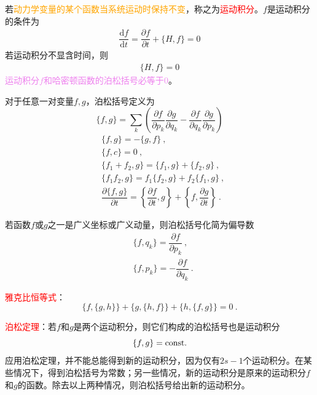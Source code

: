 \documentclass[11pt,a4paper]{article}
\newcommand{\dif}{\mathrm{d}}
\begin{document}
若\textcolor{orange}{动力学变量的某个函数当系统运动时保持不变}，称之为\textcolor{red}{运动积分}。$f$是运动积分的条件为
\begin{align*}
\dfrac{\dif f}{\dif t} = \dfrac{\partial f}{\partial t} + \{H, f \}  = 0
\end{align*}
若运动积分不显含时间，则
\begin{align*}
\{H, f \}  = 0
\end{align*}
\textcolor{violet}{运动积分$f$和哈密顿函数的泊松括号必等于$0$}。

对于任意一对变量$f, g$，泊松括号定义为
\begin{equation}
 \{f, g\} = \sum_k \left(\dfrac{\partial f}{\partial p_k} \dfrac{\partial g}{\partial q_k}  -\dfrac{\partial f}{\partial q_k}  \dfrac{\partial g}{\partial p_k} \right)
\end{equation}
\begin{align*}
& \{f, g\} = -\{g, f\} ~, \\
& \{f, c\} = 0 ~, \\
& \{f_1+f_2, g\} =  \{f_1, g\} + \{f_2, g\} ~, \\
& \{f_1f_2, g\} = f_1\{f_2, g\} +f_2\{f_1, g\} ~, \\
& \dfrac{\partial \{f, g\} }{\partial t} = \left\{\dfrac{\partial f}{\partial t} , g\right\} +\left\{f, \dfrac{\partial g}{\partial t}\right\} ~.
\end{align*}

若函数$f$或$g$之一是广义坐标或广义动量，则泊松括号化简为偏导数
\begin{align}
& \{f, q_k\} = \dfrac{\partial f}{\partial p_k} ~, \\
& \{f, p_k\} = -\dfrac{\partial f}{\partial q_k} ~.
\end{align}


\textcolor{red}{雅克比恒等式}：
\begin{equation}
\{f, \{g, h\} \} +\{g, \{h, f\} \} +\{h, \{f, g\} \} = 0 ~.
\end{equation}





\textcolor{red}{泊松定理}：若$f$和$g$是两个运动积分，则它们构成的泊松括号也是运动积分
\begin{equation}
 \{f, g\} = {\rm const.} 
\end{equation}
应用泊松定理，并不能总能得到新的运动积分，因为仅有$2s-1$个运动积分。在某些情况下，得到泊松括号为常数；另一些情况，新的运动积分是原来的运动积分$f$和$g$的函数。除去以上两种情况，则泊松括号给出新的运动积分。
\end{document}
